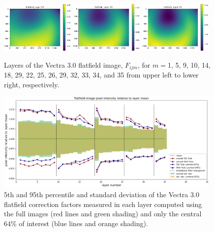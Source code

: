 \documentclass[letterpaper,11pt]{article}
\begin{document}
\begin{figure}[!ht]
\includegraphics[width=0.32\textwidth]{images/results/flatfield_layers_vectra/flatfield_layer_33}
\includegraphics[width=0.32\textwidth]{images/results/flatfield_layers_vectra/flatfield_layer_34}
\includegraphics[width=0.32\textwidth]{images/results/flatfield_layers_vectra/flatfield_layer_35}
\caption{\footnotesize Layers of the Vectra 3.0 flatfield image, $F_{ijm}$, for $m=$1, 5, 9, 10, 14, 18, 29, 22, 25, 26, 29, 32, 33, 34, and 35 from upper left to lower right, respectively.}
\label{fig:flatfield_image_layers_vectra}
\end{figure}

\begin{figure}[!ht]
\centering
\includegraphics[width=0.98\textwidth]{images/results/flatfield_pixel_intensities_vectra}
\caption{\footnotesize 5th and 95th percentile and standard deviation of the Vectra 3.0 flatfield correction factors measured in each layer computed using the full images (red lines and green shading) and only the central 64\% of interest (blue lines and orange shading).}
\label{fig:flatfield_pixel_intensities_vectra}
\end{figure} 
\end{document}
